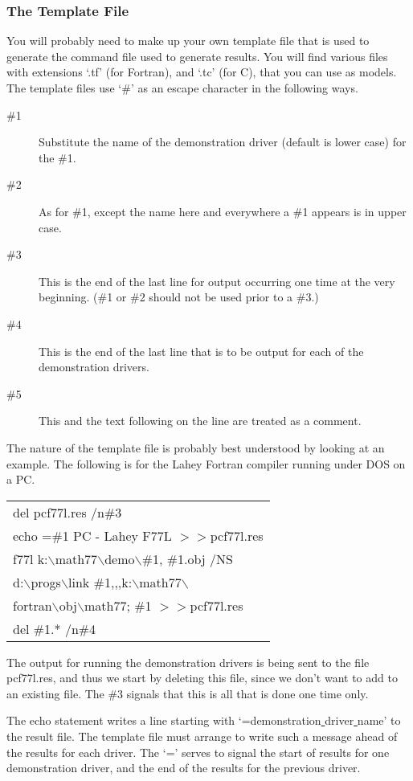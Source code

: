 \documentclass[twoside]{MATH77}
\begin{document}
\subsubsection{The Template File}

You will probably need to make up your own template file that is used to
generate the command file used to generate results.  You will find various
files with extensions `.tf' (for Fortran), and `.tc' (for C), that you can
use as models.  The template files use `\#' as an escape character in the
following ways.
\begin{description}
\item[\#1] Substitute the name of the demonstration driver (default is
lower case) for the \#1.
\item[\#2] As for \#1, except the name here and everywhere a \#1 appears
is in upper case.
\item[\#3] This is the end of the last line for output occurring one time
at the very beginning.  (\#1 or \#2 should not be used prior to a \#3.)
\item[\#4] This is the end of the last line that is to be output for each
of the demonstration drivers.
\item[\#5] This and the text following on the line are treated as a
comment. \end{description}
The nature of the template file is probably best understood by looking at
an example.  The following is for the Lahey Fortran compiler running under
DOS on a PC.

\begin{tabular}{l}
del pcf77l.res /n\#3\\
echo =\#1 PC - Lahey F77L $>>$pcf77l.res\\
f77l k:$\backslash$math77$\backslash$demo$\backslash$\#1, \#1.obj /NS\\
d:$\backslash$progs$\backslash$link \#1,,,k:$\backslash$math77$\backslash$\\
fortran$\backslash$obj$\backslash$math77; \#1 $>>$pcf77l.res\\
del \#1.* /n\#4
\end{tabular}

The output for running the demonstration drivers is being sent to the file
pcf77l.res, and thus we start by deleting this file, since we don't want
to add to an existing file.  The \#3 signals that this is all that is done
one time only.

The echo statement writes a line starting with
`=demonstration\underline{ }driver\underline{ }name' to the result file.
The template file must arrange to write such a message ahead of the
results for each driver.  The `=' serves to signal the start of results
for one demonstration driver, and the end of the results for the previous
driver.
\end{document}
